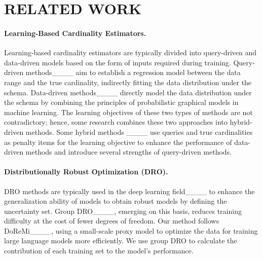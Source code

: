 \section{RELATED WORK}
\paragraph{Learning-Based Cardinality Estimators.}Learning-based cardinality estimators are typically divided into query-driven and data-driven models based on the form of inputs required during training. Query-driven methods____ aim to establish a regression model between the data range and the true cardinality, indirectly fitting the data distribution under the schema. Data-driven methods____ directly model the data distribution under the schema by combining the principles of probabilistic graphical models in machine learning. The learning objectives of these two types of methods are not contradictory; hence, some research combines these two approaches into hybrid-driven methods. Some hybrid methods ____ use queries and true cardinalities as penalty items for the learning objective to enhance the performance of data-driven methods and introduce several strengths of query-driven methods.

\paragraph{Distributionally Robust Optimization (DRO).}DRO methods are typically used in the deep learning field____ to enhance the generalization ability of models to obtain robust models by defining the uncertainty set. Group DRO____, emerging on this basis, reduces training difficulty at the cost of fewer degrees of freedom. Our method follows DoReMi____, using a small-scale proxy model to optimize the data for training large language models more efficiently. We use group DRO to calculate the contribution of each training set to the model's performance.